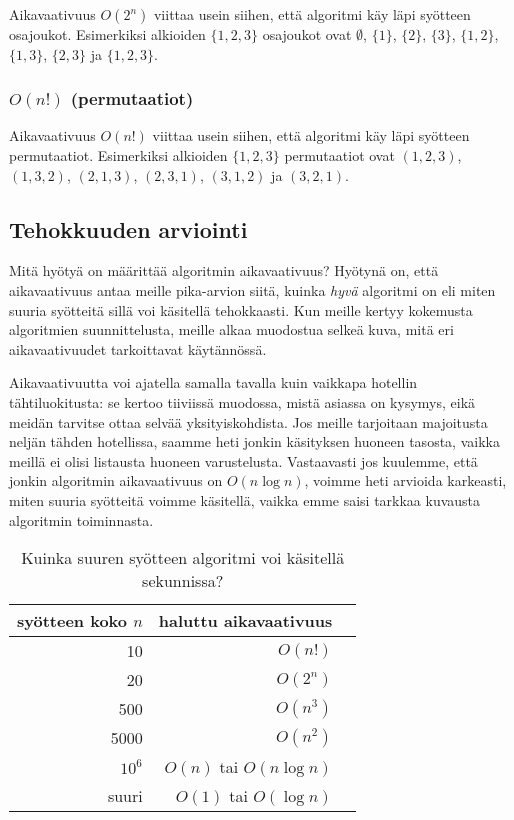 Aikavaativuus $O(2^n)$ viittaa usein siihen,
että algoritmi käy läpi syötteen osajoukot.
Esimerkiksi alkioiden $\{1,2,3\}$ osajoukot ovat
$\emptyset$, $\{1\}$, $\{2\}$, $\{3\}$, $\{1,2\}$, $\{1,3\}$, $\{2,3\}$ ja $\{1,2,3\}$.

\subsubsection{$O(n!)$ (permutaatiot)}

Aikavaativuus $O(n!)$ viittaa usein siihen,
että algoritmi käy läpi syötteen permutaatiot.
Esimerkiksi alkioiden $\{1,2,3\}$ permutaatiot ovat
$(1,2,3)$, $(1,3,2)$, $(2,1,3)$, $(2,3,1)$, $(3,1,2)$ ja $(3,2,1)$.

\subsection{Tehokkuuden arviointi}

Mitä hyötyä on määrittää algoritmin aikavaativuus?
Hyötynä on, että aikavaativuus antaa meille pika-arvion siitä,
kuinka \emph{hyvä} algoritmi on eli miten suuria syötteitä
sillä voi käsitellä tehokkaasti.
Kun meille kertyy kokemusta algoritmien suunnittelusta,
meille alkaa muodostua selkeä kuva,
mitä eri aikavaativuudet tarkoittavat käytännössä.

Aikavaativuutta voi ajatella samalla tavalla kuin vaikkapa
hotellin tähti\-luokitusta: se kertoo tiiviissä muodossa,
mistä asiassa on kysymys, eikä mei\-dän tarvitse ottaa selvää yksityiskohdista.
Jos meille tarjoitaan majoitusta neljän tähden hotellissa,
saamme heti jonkin käsityksen huoneen tasosta,
vaikka meillä ei olisi listausta huoneen varustelusta.
Vastaavasti jos kuulemme, että jonkin algoritmin aikavaativuus on $O(n \log n)$,
voimme heti arvioida karkeasti, miten suuria syötteitä voimme käsitellä,
vaikka emme saisi tarkkaa kuvausta algoritmin toiminnasta.

\begin{table}
\center
\begin{tabular}{rrr}
syötteen koko $n$ & haluttu aikavaativuus \\
\hline
10 & $O(n!)$ \\
20 & $O(2^n)$ \\
500 & $O(n^3)$ \\
5000 & $O(n^2)$ \\
$10^6$ & $O(n)$ tai $O(n \log n)$ \\
suuri & $O(1)$ tai $O(\log n)$ \\
\end{tabular}
\caption{Kuinka suuren syötteen algoritmi voi käsitellä sekunnissa?}
\label{tab:algteh}
\end{table}

